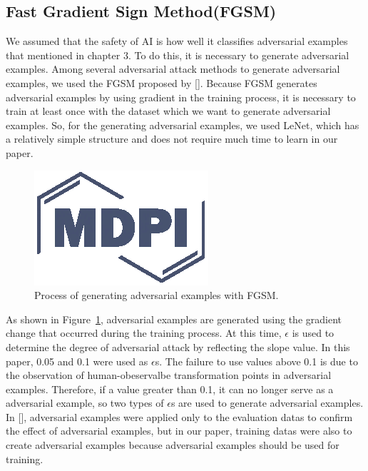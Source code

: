 \documentclass[journal,article,submit,moreauthors,pdftex]{Definitions/mdpi}
\begin{document}
\subsection{Fast Gradient Sign Method(FGSM)}

We assumed that the safety of AI is how well it classifies adversarial examples that mentioned in chapter 3.
To do this, it is necessary to generate adversarial examples. Among several adversarial attack methods to generate adversarial examples, we used the FGSM proposed by [].
Because FGSM generates adversarial examples by using gradient in the training process, it is necessary to train at least once with the dataset which we want to generate adversarial examples.
So, for the generating adversarial examples, we used LeNet, which has a relatively simple structure and does not require much time to learn in our paper.

\begin{figure}[H] 
\includegraphics[width=5 cm]{Definitions/logo-mdpi}
\caption{Process of generating adversarial examples with FGSM.\label{fig4}}
\end{figure} 

As shown in Figure~\ref{fig4}, adversarial examples are generated using the gradient change that occurred during the training process.
At this time, \begin{math}\epsilon\end{math} is used to determine the degree of adversarial attack by reflecting the slope value.
In this paper, 0.05 and 0.1 were used as \begin{math}\epsilon\end{math}s. The failure to use values above 0.1 is due to the observation of human-obeservalbe transformation points in adversarial examples.
Therefore, if a value greater than 0.1, it can no longer serve as a adversarial example, so two types of \begin{math}\epsilon\end{math}s are used to generate adversarial examples.
In [], adversarial examples were applied only to the evaluation datas to confirm the effect of adversarial examples, but in our paper, training datas were also to create adversarial examples because adversarial examples should be used for training.
\end{document}
